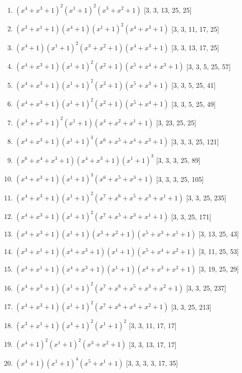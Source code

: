 \documentclass[10pt,twocolumn]{article}
\begin{document}
\begin{enumerate}
\item $(x^{4} + x^{3} + 1)^{2}(x^{1} + 1)^{2}(x^{3} + x^{2} + 1)$  [3, 3, 13, 25, 25]
\item $(x^{3} + x^{1} + 1)(x^{4} + 1)(x^{1} + 1)^{2}(x^{4} + x^{3} + 1)$  [3, 3, 11, 17, 25]
\item $(x^{4} + 1)(x^{1} + 1)^{2}(x^{3} + x^{2} + 1)(x^{4} + x^{3} + 1)$  [3, 3, 13, 17, 25]
\item $(x^{4} + x^{3} + 1)(x^{1} + 1)^{2}(x^{2} + 1)(x^{5} + x^{4} + x^{3} + 1)$  [3, 3, 5, 25, 57]
\item $(x^{4} + x^{3} + 1)(x^{1} + 1)^{2}(x^{2} + 1)(x^{5} + x^{3} + 1)$  [3, 3, 5, 25, 41]
\item $(x^{4} + x^{3} + 1)(x^{1} + 1)^{2}(x^{2} + 1)(x^{5} + x^{4} + 1)$  [3, 3, 5, 25, 49]
\item $(x^{4} + x^{3} + 1)^{2}(x^{1} + 1)(x^{4} + x^{2} + x^{1} + 1)$  [3, 23, 25, 25]
\item $(x^{4} + x^{3} + 1)(x^{1} + 1)^{3}(x^{6} + x^{5} + x^{4} + x^{3} + 1)$  [3, 3, 3, 25, 121]
\item $(x^{6} + x^{4} + x^{3} + 1)(x^{4} + x^{3} + 1)(x^{1} + 1)^{3}$  [3, 3, 3, 25, 89]
\item $(x^{4} + x^{3} + 1)(x^{1} + 1)^{3}(x^{6} + x^{5} + x^{3} + 1)$  [3, 3, 3, 25, 105]
\item $(x^{4} + x^{3} + 1)(x^{1} + 1)^{2}(x^{7} + x^{6} + x^{5} + x^{3} + x^{1} + 1)$  [3, 3, 25, 235]
\item $(x^{4} + x^{3} + 1)(x^{1} + 1)^{2}(x^{7} + x^{5} + x^{3} + x^{1} + 1)$  [3, 3, 25, 171]
\item $(x^{4} + x^{3} + 1)(x^{1} + 1)(x^{3} + x^{2} + 1)(x^{5} + x^{3} + x^{1} + 1)$  [3, 13, 25, 43]
\item $(x^{3} + x^{1} + 1)(x^{4} + x^{3} + 1)(x^{1} + 1)(x^{5} + x^{4} + x^{2} + 1)$  [3, 11, 25, 53]
\item $(x^{4} + x^{1} + 1)(x^{4} + x^{3} + 1)(x^{1} + 1)(x^{4} + x^{3} + x^{2} + 1)$  [3, 19, 25, 29]
\item $(x^{4} + x^{3} + 1)(x^{1} + 1)^{2}(x^{7} + x^{6} + x^{5} + x^{3} + x^{2} + 1)$  [3, 3, 25, 237]
\item $(x^{4} + x^{3} + 1)(x^{1} + 1)^{2}(x^{7} + x^{6} + x^{4} + x^{2} + 1)$  [3, 3, 25, 213]
\item $(x^{3} + x^{1} + 1)(x^{4} + 1)^{2}(x^{1} + 1)^{2}$  [3, 3, 11, 17, 17]
\item $(x^{4} + 1)^{2}(x^{1} + 1)^{2}(x^{3} + x^{2} + 1)$  [3, 3, 13, 17, 17]
\item $(x^{4} + 1)(x^{1} + 1)^{4}(x^{5} + x^{1} + 1)$  [3, 3, 3, 3, 17, 35]

\end{enumerate}
\end{document}
